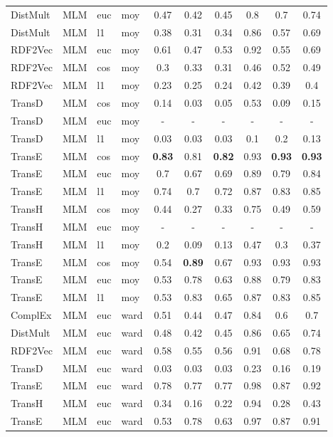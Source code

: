\begin{longtable}{|llll|ccc|ccc|}
DistMult	&	MLM	&	euc	&	moy	&	0.47	&	0.42	&	0.45	&	0.8	&	0.7	&	0.74 \\ 
DistMult	&	MLM	&	l1	&	moy	&	0.38	&	0.31	&	0.34	&	0.86	&	0.57	&	0.69 \\ 
RDF2Vec	&	MLM	&	euc	&	moy	&	0.61	&	0.47	&	0.53	&	0.92	&	0.55	&	0.69 \\ 
RDF2Vec	&	MLM	&	cos	&	moy	&	0.3	&	0.33	&	0.31	&	0.46	&	0.52	&	0.49 \\ 
RDF2Vec	&	MLM	&	l1	&	moy	&	0.23	&	0.25	&	0.24	&	0.42	&	0.39	&	0.4 \\ 
TransD	&	MLM	&	cos	&	moy	&	0.14	&	0.03	&	0.05	&	0.53	&	0.09	&	0.15 \\ 
TransD	&	MLM	&	euc	&	moy	&	-	&	-	&	-	&	-	&	-	&	-\\
TransD	&	MLM	&	l1	&	moy	&	0.03	&	0.03	&	0.03	&	0.1	&	0.2	&	0.13 \\ 
TransE	&	MLM	&	cos	&	moy	&	\textbf{0.83}	&	0.81	&	\textbf{0.82}	&	0.93	&	\textbf{0.93}	&	\textbf{0.93} \\ 
TransE	&	MLM	&	euc	&	moy	&	0.7	&	0.67	&	0.69	&	0.89	&	0.79	&	0.84 \\ 
TransE	&	MLM	&	l1	&	moy	&	0.74	&	0.7	&	0.72	&	0.87	&	0.83	&	0.85 \\ 
TransH	&	MLM	&	cos	&	moy	&	0.44	&	0.27	&	0.33	&	0.75	&	0.49	&	0.59 \\ 
TransH	&	MLM	&	euc	&	moy	&	-	&	-	&	-	&	-	&	-	&	- \\ 
TransH	&	MLM	&	l1	&	moy	&	0.2	&	0.09	&	0.13	&	0.47	&	0.3	&	0.37 \\ 
TransE	&	MLM	&	cos	&	moy	&	0.54	&	\textbf{0.89}	&	0.67	&	0.93	&	0.93	&	0.93 \\ 
TransE	&	MLM	&	euc	&	moy	&	0.53	&	0.78	&	0.63	&	0.88	&	0.79	&	0.83 \\ 
TransE	&	MLM	&	l1	&	moy	&	0.53	&	0.83	&	0.65	&	0.87	&	0.83	&	0.85 \\ 
ComplEx	&	MLM	&	euc	&	ward	&	0.51	&	0.44	&	0.47	&	0.84	&	0.6	&	0.7 \\ 
DistMult	&	MLM	&	euc	&	ward	&	0.48	&	0.42	&	0.45	&	0.86	&	0.65	&	0.74 \\ 
RDF2Vec	&	MLM	&	euc	&	ward	&	0.58	&	0.55	&	0.56	&	0.91	&	0.68	&	0.78 \\ 
TransD	&	MLM	&	euc	&	ward	&	0.03	&	0.03	&	0.03	&	0.23	&	0.16	&	0.19 \\ 
TransE	&	MLM	&	euc	&	ward	&	0.78	&	0.77	&	0.77	&	0.98	&	0.87	&	0.92 \\ 
TransH	&	MLM	&	euc	&	ward	&	0.34	&	0.16	&	0.22	&	0.94	&	0.28	&	0.43 \\ 
TransE	&	MLM	&	euc	&	ward	&	0.53	&	0.78	&	0.63	&	0.97	&	0.87	&	0.91 \\ 

\end{longtable}
